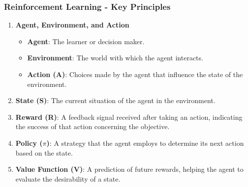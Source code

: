 \documentclass[aspectratio=169]{beamer}
\begin{document}
\begin{frame}[fragile]
    \frametitle{Reinforcement Learning - Key Principles}
    \begin{enumerate}
        \item \textbf{Agent, Environment, and Action}
            \begin{itemize}
                \item \textbf{Agent}: The learner or decision maker.
                \item \textbf{Environment}: The world with which the agent interacts.
                \item \textbf{Action (A)}: Choices made by the agent 
                      that influence the state of the environment.
            \end{itemize}
        \item \textbf{State (S)}: The current situation of the agent in the environment.
        \item \textbf{Reward (R)}: A feedback signal received after taking 
              an action, indicating the success of that action concerning the objective.
        \item \textbf{Policy ($\pi$)}: A strategy that the agent employs 
              to determine its next action based on the state.
        \item \textbf{Value Function (V)}: A prediction of future rewards, 
              helping the agent to evaluate the desirability of a state.
    \end{enumerate}
\end{frame}
\end{document}
